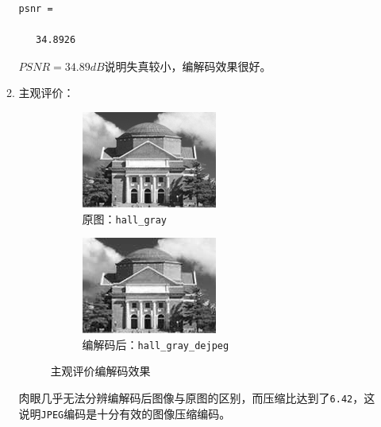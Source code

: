 \documentclass{article}
\numberwithin{figure}{section}
\numberwithin{table}{section}
\numberwithin{listing}{section}
\numberwithin{equation}{section}
\begin{document}
\begin{enumerate}
\begin{enumerate}
\begin{verbatim}
psnr =

   34.8926
                        \end{verbatim}

                        $PSNR=34.89dB$说明失真较小，编解码效果很好。

                    \item 主观评价：
                        \begin{figure}[H]
                            \centering
                            \begin{subfigure}{0.5\textwidth}
                                \centering
                                \includegraphics[width=0.6\linewidth]{hall_gray}
                                \caption{原图：\texttt{hall\_gray}}
                            \end{subfigure}%
                            \begin{subfigure}{0.5\textwidth}
                                \centering
                                \includegraphics[width=0.6\linewidth]{hall_gray_dejpeg}
                                \caption{编解码后：\texttt{hall\_gray\_dejpeg}}
                            \end{subfigure}
                            \caption{主观评价编解码效果}
                        \end{figure}

                        肉眼几乎无法分辨编解码后图像与原图的区别，而压缩比达到了\texttt{6.42}，这说明\texttt{JPEG}编码是十分有效的图像压缩编码。


\end{enumerate}
\end{enumerate}
\end{document}
